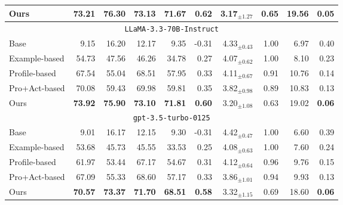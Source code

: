\begin{table*}[tb]
{\begin{tabular}{lrrrrrrrrr}
Ours          & \textbf{73.21}   & \textbf{76.30}   & \textbf{73.13}  & \textbf{71.67} & \textbf{0.62}  & 3.17$_{\pm1.27}$    & 0.65              & 19.56         & \textbf{0.05} \\ \bottomrule
\toprule
\multicolumn{10}{c}{\cellcolor[HTML]{EFEFEF}\texttt{LLaMA-3.3-70B-Instruct}}                              \\ \midrule
Base          &  9.15       & 16.20             & 12.17         &  9.35       & -0.31  & 4.33$_{\pm0.43}$    & 1.00              & 6.97          & 0.40 \\
Example-based & 54.73       & 47.56             & 46.26         & 34.78       & 0.27    & 4.07$_{\pm0.62}$    & 1.00              & 8.10          & 0.23\\
Profile-based & 67.54       & 55.04             & 68.51         & 57.95       & 0.33   & 4.11$_{\pm0.67}$    & 0.91              & 10.76          & 0.14 \\
Pro+Act-based & 70.08       & 59.43             & 69.98         & 59.81       & 0.35   & 3.82$_{\pm0.98}$    & 0.89              & 10.83          & 0.13\\ \hline
Ours          & \textbf{73.92}   & \textbf{75.90}   & \textbf{73.10}  & \textbf{71.81} & \textbf{0.60}  & 3.20$_{\pm1.08}$    & 0.63              & 19.02         & \textbf{0.06} \\ \bottomrule
\toprule
\multicolumn{10}{c}{\cellcolor[HTML]{EFEFEF}\texttt{gpt-3.5-turbo-0125}}                              \\ \midrule
Base          &  9.01       & 16.17             & 12.15         &  9.30       & -0.31  & 4.42$_{\pm0.47}$    & 1.00              & 6.60          & 0.39 \\
Example-based & 53.68       & 45.73             & 45.55         & 33.53       & 0.25    & 4.08$_{\pm0.63}$    & 1.00              & 7.60          & 0.24\\
Profile-based & 61.97       & 53.44             & 67.17         & 54.67       & 0.31   & 4.12$_{\pm0.64}$    & 0.96              & 9.76          & 0.15 \\
Pro+Act-based & 67.09       & 55.33             & 68.60         & 57.17       & 0.33   & 3.86$_{\pm1.01}$    & 0.94              & 9.93          & 0.13\\ \hline
Ours          & \textbf{70.57}   & \textbf{73.37}   & \textbf{71.70}  & \textbf{68.51} & \textbf{0.58}  & 3.32$_{\pm1.15}$    & 0.69              & 18.60         & \textbf{0.06} \\ \bottomrule

\end{tabular}}
\end{table*}
